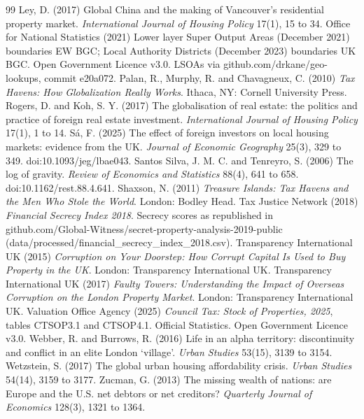 \documentclass[11pt,a4paper]{article}
\begin{document}
\begin{thebibliography}{99}
 Ley, D. (2017) Global China and the making of Vancouver's residential property market. \textit{International Journal of Housing Policy} 17(1), 15 to 34.
 Office for National Statistics (2021) Lower layer Super Output Areas (December 2021) boundaries EW BGC; Local Authority Districts (December 2023) boundaries UK BGC. Open Government Licence v3.0. LSOAs via github.com/drkane/geo-lookups, commit e20a072.
 Palan, R., Murphy, R. and Chavagneux, C. (2010) \textit{Tax Havens: How Globalization Really Works}. Ithaca, NY: Cornell University Press.
 Rogers, D. and Koh, S. Y. (2017) The globalisation of real estate: the politics and practice of foreign real estate investment. \textit{International Journal of Housing Policy} 17(1), 1 to 14.
 S\'a, F. (2025) The effect of foreign investors on local housing markets: evidence from the UK. \textit{Journal of Economic Geography} 25(3), 329 to 349. doi:10.1093/jeg/lbae043.
 Santos Silva, J. M. C. and Tenreyro, S. (2006) The log of gravity. \textit{Review of Economics and Statistics} 88(4), 641 to 658. doi:10.1162/rest.88.4.641.
 Shaxson, N. (2011) \textit{Treasure Islands: Tax Havens and the Men Who Stole the World}. London: Bodley Head.
 Tax Justice Network (2018) \textit{Financial Secrecy Index 2018}. Secrecy scores as republished in github.com/Global-Witness/secret-property-analysis-2019-public (data/processed/financial\_secrecy\_index\_2018.csv).
 Transparency International UK (2015) \textit{Corruption on Your Doorstep: How Corrupt Capital Is Used to Buy Property in the UK}. London: Transparency International UK.
 Transparency International UK (2017) \textit{Faulty Towers: Understanding the Impact of Overseas Corruption on the London Property Market}. London: Transparency International UK.
 Valuation Office Agency (2025) \textit{Council Tax: Stock of Properties, 2025}, tables CTSOP3.1 and CTSOP4.1. Official Statistics. Open Government Licence v3.0.
 Webber, R. and Burrows, R. (2016) Life in an alpha territory: discontinuity and conflict in an elite London `village'. \textit{Urban Studies} 53(15), 3139 to 3154.
 Wetzstein, S. (2017) The global urban housing affordability crisis. \textit{Urban Studies} 54(14), 3159 to 3177.
 Zucman, G. (2013) The missing wealth of nations: are Europe and the U.S. net debtors or net creditors? \textit{Quarterly Journal of Economics} 128(3), 1321 to 1364.
\end{thebibliography}
\end{document}
